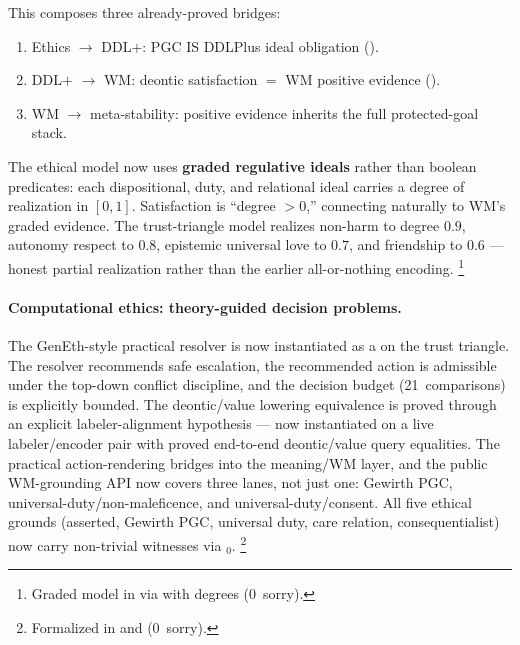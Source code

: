 \documentclass[11pt,openany]{report}
\begin{document}
\noindent
This composes three already-proved bridges:
\begin{enumerate}
\item Ethics $\to$ DDL$+$: PGC IS DDLPlus ideal obligation ().
\item DDL$+$ $\to$ WM: deontic satisfaction $=$ WM positive evidence ().
\item WM $\to$ meta-stability: positive evidence inherits the full protected-goal stack.
\end{enumerate}
\noindent
The ethical model now uses \textbf{graded regulative ideals} rather than
boolean predicates: each dispositional, duty, and relational ideal carries a
degree of realization in $[0,1]$.  Satisfaction is ``degree $> 0$,'' connecting
naturally to WM's graded evidence.  The trust-triangle model realizes non-harm
to degree $0.9$, autonomy respect to $0.8$, epistemic universal love to $0.7$,
and friendship to $0.6$ --- honest partial realization rather than the earlier
all-or-nothing encoding.%
\footnote{Graded model in
via  with  degrees (0~sorry).}

\paragraph{Computational ethics: theory-guided decision problems.}

The GenEth-style practical resolver is now instantiated as a
 on the trust triangle.  The resolver
recommends safe escalation, the recommended action is admissible under the
top-down conflict discipline, and the decision budget (21~comparisons) is
explicitly bounded.  The deontic/value lowering equivalence is proved through
an explicit labeler-alignment hypothesis --- now instantiated on a live
labeler/encoder pair with proved end-to-end deontic/value query equalities.
The practical action-rendering bridges into the meaning/WM layer, and the
public WM-grounding API now covers three lanes, not just one: Gewirth PGC,
universal-duty/non-maleficence, and universal-duty/consent.  All five ethical
grounds (asserted, Gewirth PGC, universal duty, care relation, consequentialist)
now carry non-trivial witnesses via \(_0\).%
\footnote{Formalized in
and
(0~sorry).}
\end{document}
